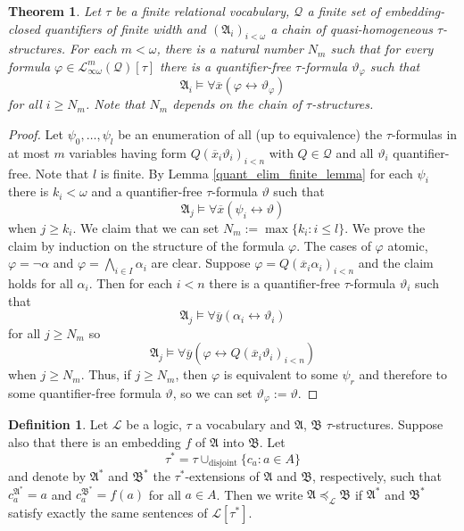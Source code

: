 \documentclass{ndjflart}
\theoremstyle{plain}
\newtheorem{theorem}[conjecture]{Theorem}
\theoremstyle{definition}
\newtheorem{definition}[conjecture]{Definition}
\numberwithin{equation}{section}
\DeclareMathOperator{\disjoint}{disjoint}
\begin{document}
\begin{theorem}\label{finite}
Let $\tau$ be a finite relational vocabulary, $\mathcal{Q}$ a finite set of embed\-ding-closed quantifiers of finite width and 
$(\mathfrak{A}_i)_{i<\omega}$ a chain of quasi-ho\-mo\-ge\-neous $\tau$-structures.
For each $m< \omega$, there is a natural number $N_m$ such that for every formula $\varphi \in \mathcal{L}^m_{\infty \omega}(\mathcal{Q})[\tau]$ there is a quantifier-free $\tau$-formula $\vartheta_{\varphi}$ such that
\[
	\mathfrak{A}_i \vDash \forall \overline{x}(\varphi \leftrightarrow \vartheta_{\varphi})
\]
for all $i \geq N_m$.
Note that $N_m$ depends on the chain of $\tau$-structures.
\end{theorem}
\begin{proof}
Let $\psi_0,\dots,\psi_l$ be an enumeration of all (up to equivalence) the $\tau$-formulas in at most $m$ variables having form $Q(\overline{x}_i\vartheta_i)_{i<n}$ with $Q \in \mathcal{Q}$ and all $\vartheta_i$ quantifier-free.
Note that $l$ is finite.
By Lemma \ref{quant_elim_finite_lemma} for each $\psi_i$ there is $k_i < \omega$ and a quantifier-free $\tau$-formula $\vartheta$ such that
\[
	\mathfrak{A}_j \vDash \forall \overline{x} (\psi_i \leftrightarrow \vartheta)
\]
when $j \geq k_i$.
We claim that we can set $N_m := \max\{k_i : i \leq l\}$. 
We prove the claim by induction on the structure of the formula $\varphi$.
The cases of $\varphi$ atomic, $\varphi = \neg \alpha$ and $\varphi = \bigwedge_{i \in I}\alpha_i$ are clear. Suppose $\varphi = Q(\overline{x}_i\alpha_i)_{i<n}$ and the claim holds for all $\alpha_i$.
Then for each $i < n$ there is a quantifier-free $\tau$-formula $\vartheta_i$ such that 
\[
	\mathfrak{A}_j \vDash \forall \overline{y}(\alpha_i \leftrightarrow \vartheta_i)
\]
for all $j \geq N_m$ so
\[
	\mathfrak{A}_j \vDash \forall \overline{y}(\varphi \leftrightarrow Q(\overline{x}_i\vartheta_i)_{i<n})
\]
when $j \geq N_m$. Thus, if $j \geq N_m$, then $\varphi$ is equivalent to some $\psi_r$ and therefore to some quantifier-free formula $\vartheta$, so we can set $\vartheta_{\varphi} := \vartheta$.
\end{proof}

\begin{definition}
Let $\mathcal{L}$ be a logic, $\tau$ a vocabulary and $\mathfrak{A}$, $\mathfrak{B}$ $\tau$-structures.
Suppose also that there is an embedding $f$ of $\mathfrak{A}$ into $\mathfrak{B}$.
Let 
\[
	\tau^* = \tau \cup_{\disjoint} \{c_a : a \in A\}
\] 
and denote by $\mathfrak{A}^*$ and $\mathfrak{B}^*$ the $\tau^*$-extensions of $\mathfrak{A}$ and $\mathfrak{B}$, respectively, such that $c_a^{\mathfrak{A}^*} = a$ and $c_a^{\mathfrak{B}^*} = f(a)$ for all $a \in A$. 
Then we write $\mathfrak{A} \preceq_{\mathcal{L}} \mathfrak{B}$ if $\mathfrak{A}^*$ and $\mathfrak{B}^*$ satisfy exactly the same sentences of $\mathcal{L}[\tau^*]$.
\end{definition}
\end{document}
